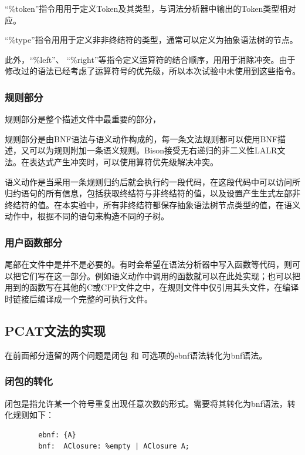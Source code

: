 \documentclass{article}
\begin{document}
	“\%token”指令⽤用于定义Token及其类型，与词法分析器中输出的Token类型相对应。 
	
	“\%type”指令⽤用于定义⾮非终结符的类型，通常可以定义为抽象语法树的节点。
	
	此外，“\%left”、 “\%right”等指令定义运算符的结合顺序，⽤用于消除冲突。由于修改过的语法已经考虑了运算符号的优先级，所以本次试验中未使用到这些指令。
	
	\subsubsection{规则部分}
	规则部分是整个描述文件中最重要的部分，
	
	规则部分是由BNF语法与语义动作构成的，每一条文法规则都可以使用BNF描述，又可以为规则附加一条语义规则。Bison接受无右递归的非二义性LALR文法。在表达式产生冲突时，可以使用算符优先级解决冲突。
	
	语义动作是当采⽤一条规则归约后就会执⾏的⼀段代码，在这段代码中可以访问所归约语句的所有信息，包括获取终结符与非终结符的值，以及设置产⽣生式左部非终结符的值。在本实验中，所有⾮终结符都保存抽象语法树节点类型的值，在语义动作中，根据不同的语句来构造不同的⼦树。

	\subsubsection{用户函数部分}
	尾部在⽂件中是并不是必要的。有时会希望在语法分析器中写⼊函数等代码，则可以把它们写在这一部分。例如语义动作中调⽤的函数就可以在此处实现；也可以把用到的函数写在其他的C或CPP文件之中，在规则⽂件中仅引用其头文件，在编译时链接后编译成一个完整的可执行文件。
	

\subsection{PCAT文法的实现}
	在前面{\color{blue}{语法的整理}}部分遗留的两个问题是闭包 和 可选项的ebnf语法转化为bnf语法。
	
	\subsubsection*{闭包的转化}
	闭包是指允许某一个符号重复出现任意次数的形式。需要将其转化为bnf语法，转化规则如下：
	\begin{small}
		\begin{lstlisting}
		ebnf: {A}
		bnf:  AClosure: %empty | AClosure A;
		\end{lstlisting}
	\end{small}
	
\end{document}
